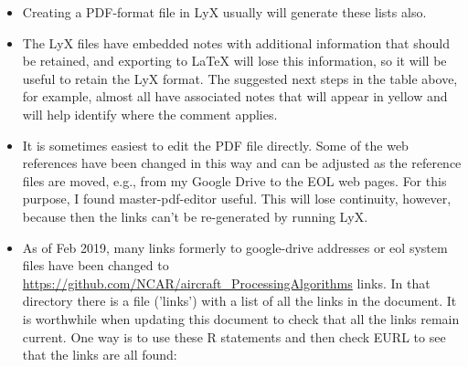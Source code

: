 \documentclass[
  english,
]{book}
\begin{document}
\begin{itemize}
  \begin{itemize}
  \item
    entries like 'wind!relative' will generate index entries as
    subordinate entries with 'relative' below 'wind'. In the Rmd
    version, the index is not generated automatically but the existing
    links should remain valid as the text is changed. To add a variable,
    use a subsection or subsubsection entry and identify a label by
    following the heading with \{\#newlabel\}. Then follow the pattern
    in the existing index to add an entry for the new term. Also add a
    similar link to the list of variables in Appendix B.
  \item
    I have tried to emphasize using nouns to start index entries, so for
    example I would favor ``coefficient!calibration'' over ``calibration
    coefficient.\\
  \item
    It is sometimes useful to generate ``see xxx'' entries, which can be
    done as follows in the LyX version: ``INS\textbar see \{Inertial
    Navigation System\}'' where the part in braces is also in LaTeX
    code, generated by pressing CNTL-L.\\
  \end{itemize}
\item
  Creating a PDF-format file in LyX usually will generate these lists
  also.\\
\item
  The LyX files have embedded notes with additional information that
  should be retained, and exporting to LaTeX will lose this information,
  so it will be useful to retain the LyX format. The suggested next
  steps in the table above, for example, almost all have associated
  notes that will appear in yellow and will help identify where the
  comment applies.\\
\item
  It is sometimes easiest to edit the PDF file directly. Some of the web
  references have been changed in this way and can be adjusted as the
  reference files are moved, e.g., from my Google Drive to the EOL web
  pages. For this purpose, I found master-pdf-editor useful. This will
  lose continuity, however, because then the links can't be re-generated
  by running LyX.\\
\item
  As of Feb 2019, many links formerly to google-drive addresses or eol
  system files have been changed to
  \url{https://github.com/NCAR/aircraft_ProcessingAlgorithms} links. In
  that directory there is a file ('links') with a list of all the links
  in the document. It is worthwhile when updating this document to check
  that all the links remain current. One way is to use these R
  statements and then check EURL to see that the links are all found:
\end{itemize}
\end{document}

